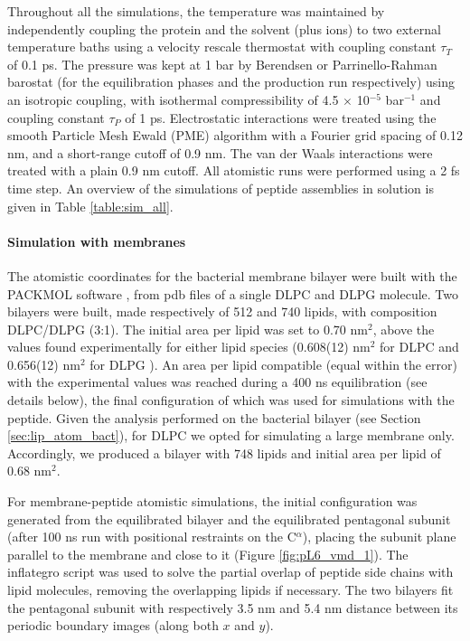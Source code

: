 Throughout all the simulations, the temperature was maintained by independently coupling the protein and the solvent (plus ions) to two external temperature baths using a velocity rescale thermostat \citep{Bussi2007} with coupling constant $\tau _T$ of 0.1 ps. The pressure was kept at 1 bar by Berendsen \citep{Berendsen1984} or Parrinello-Rahman barostat \citep{Parrinello1981} (for the equilibration phases and the production run respectively) using an isotropic coupling, with isothermal compressibility of 4.5 $\times$ 10$^{-5}$ bar$^{-1}$ and coupling constant $\tau_P$ of 1 ps. Electrostatic interactions were treated using the smooth Particle Mesh Ewald (PME) algorithm \citep{Essmann1995} with a Fourier grid spacing of 0.12 nm, and a short-range cutoff of 0.9 nm. The van der Waals interactions were treated with a plain 0.9 nm cutoff. All atomistic runs were performed using a 2 fs time step. An overview of the simulations of peptide assemblies in solution is given in Table \ref{table:sim_all}.

\paragraph{Simulation with membranes} The atomistic coordinates for the bacterial membrane bilayer were built with the PACKMOL software \citep{Martinez2009}, from pdb files of a single DLPC \citep{PogerOrig} and DLPG \citep{Kukol2009} molecule. Two bilayers were built, made respectively of 512 and 740 lipids, with composition DLPC/DLPG (3:1). The initial area per lipid was set to 0.70 nm$^2$, above the values found experimentally for either lipid species (0.608(12) nm$^2$ for DLPC \citep{Kucerka2011} and 0.656(12) nm$^2$ for DLPG \citep{Pan2012}). An area per lipid compatible (equal within the error) with the experimental values was reached during a 400 ns equilibration (see details below), the final configuration of which was used for simulations with the peptide.
Given the analysis performed on the bacterial bilayer (see Section \ref{sec:lip_atom_bact}), for DLPC we opted for simulating a large membrane only. Accordingly, we produced a bilayer with 748 lipids and initial area per lipid of 0.68 nm$^2$.

For membrane-peptide atomistic simulations, the initial configuration was generated from the equilibrated bilayer and the equilibrated pentagonal subunit (after 100 ns run with positional restraints on the C$^\alpha$), placing the subunit plane parallel to the membrane and close to it (Figure \ref{fig:pL6_vmd_1}).
%
The inflategro script \citep{Kandt2007} was used to solve the partial overlap of peptide side chains with lipid molecules, removing the overlapping lipids if necessary.
%
The two bilayers fit the pentagonal subunit with respectively 3.5 nm and 5.4 nm distance between its periodic boundary images (along both $x$ and $y$).

